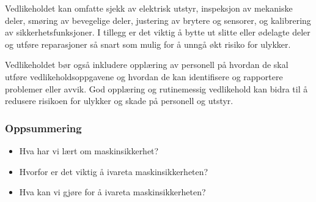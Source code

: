 \documentclass[aspectratio=169,xcolor=dvipsnames]{beamer}
\begin{document}
\begin{frame}
\begin{itemize}
{Vedlikeholdet kan omfatte sjekk av elektrisk utstyr, inspeksjon av mekaniske deler, smøring av bevegelige deler, justering av brytere og sensorer, og kalibrering av sikkerhetsfunksjoner. I tillegg er det viktig å bytte ut slitte eller ødelagte deler og utføre reparasjoner så snart som mulig for å unngå økt risiko for ulykker.

		Vedlikeholdet bør også inkludere opplæring av personell på hvordan de skal utføre vedlikeholdsoppgavene og hvordan de kan identifisere og rapportere problemer eller avvik. God opplæring og rutinemessig vedlikehold kan bidra til å redusere risikoen for ulykker og skade på personell og utstyr.}
\end{itemize}
\end{frame}
\begin{frame}
	\frametitle{Oppsummering}


\begin{itemize}
	\item Hva har vi lært om maskinsikkerhet?
	\item Hvorfor er det viktig å ivareta maskinsikkerheten?
	\item Hva kan vi gjøre for å ivareta maskinsikkerheten?
\end{itemize}
\end{frame}
\end{document}

